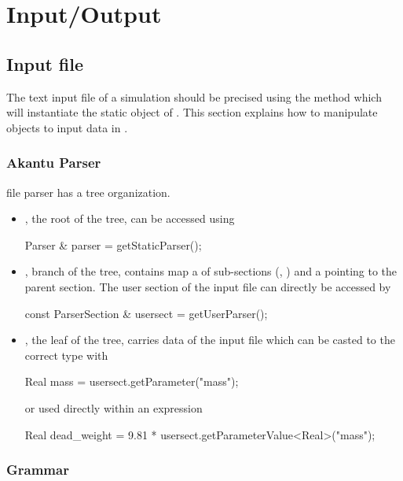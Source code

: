 \chapter{Input/Output}

\section{Input file \label{sect:parser}}

The text input file of a simulation should be precised using the method  which will instantiate the static  object of \akantu. This section explains how to manipulate  objects to input data in \akantu.      
\begin{cpp}
int main(int argc, char *argv[]) {
  initialize("input_files.dat", argc, argv);
  ...
\end{cpp}

\subsection{Akantu Parser}

\akantu file parser has a tree organization.
\begin{itemize}
\item {}, the root of the tree, can be accessed using
\begin{cpp}
Parser & parser = getStaticParser();
\end{cpp}
\item {}, branch of the tree, contains map a of sub-sections (, ) and a  pointing to the parent section. The user section of the input file can directly be accessed by
\begin{cpp}
const ParserSection & usersect = getUserParser();
\end{cpp} 
\item {}, the leaf of the tree, carries data of the input file which can be casted to the correct type with
\begin{cpp}
Real mass = usersect.getParameter("mass");
\end{cpp}
or used directly within an expression
\begin{cpp}
Real dead_weight = 9.81 * usersect.getParameterValue<Real>("mass");
\end{cpp}
\end{itemize}

\subsection{Grammar}

